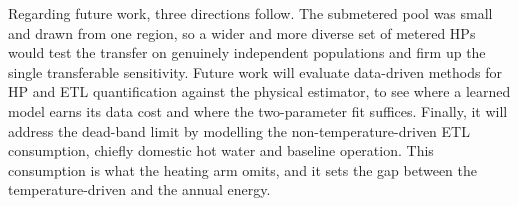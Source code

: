 \documentclass[9pt,journal,a4]{IEEEtran}
\begin{document}
Regarding future work, three directions follow. The submetered pool was small and drawn from one region, so a wider and more diverse set of metered HPs would test the transfer on genuinely independent populations and firm up the single transferable sensitivity. Future work will evaluate data-driven methods for HP and ETL quantification against the physical estimator, to see where a learned model earns its data cost and where the two-parameter fit suffices. Finally, it will address the dead-band limit by modelling the non-temperature-driven ETL consumption, chiefly domestic hot water and baseline operation. This consumption is what the heating arm omits, and it sets the gap between the temperature-driven and the annual energy.

\balance


\end{document}
